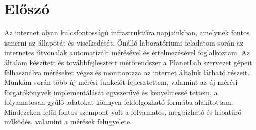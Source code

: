 
\chapter*{Előszó}

Az internet olyan kulcsfontosságú infrastruktúra napjainkban, amelynek fontos ismerni az állapotát és viselkedését. Önálló laboratóriumi feladatom során az internetes útvonalak automatizált mérésével és értelmezésével foglalkoztam. Az általam készített és továbbfejlesztett mérőrendszer a PlanetLab szervezet gépeit felhasználva méréseket végez és monitorozza az internet általuk látható részeit. Munkám során több új mérési funkciót fejlesztettem, valamint az új mérési forgatókönyvek implementálását egyszerűvé és kényelmessé tettem, a folyamatosan gyűlő adatokat könnyen feldolgozható formába alakítottam. Mindezeken felül fontos szempont volt a folyamatos, megbízható és hibatűrő működés, valamint a mérések felügyelete.







